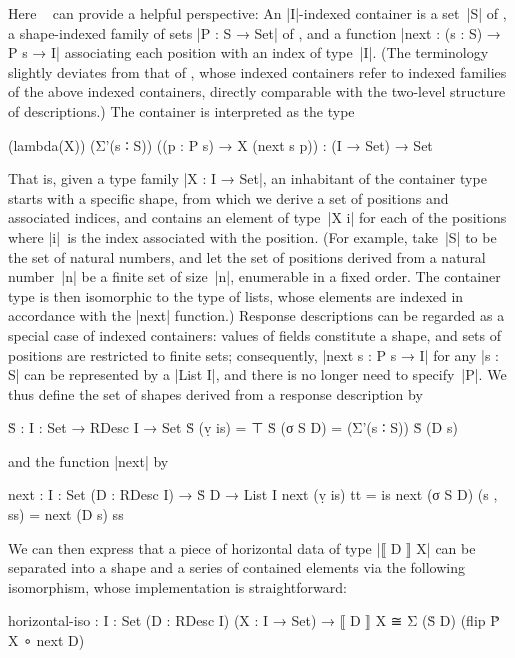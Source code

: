 Here ~\citep[Chapter~8]{Morris-thesis} can provide a helpful perspective:
An |I|-indexed container is a set~|S| of , a shape-indexed family of sets |P : S → Set| of , and a function |next : (s : S) → P s → I| associating each position with an index of type~|I|.
(The terminology slightly deviates from that of \citeauthor{Morris-thesis}, whose indexed containers refer to indexed families of the above indexed containers, directly comparable with the two-level structure of descriptions.)
The container is interpreted as the type
\begin{code}
(lambda(X)) (Σ'(s ∶ S)) ((p : P s) → X (next s p)) : (I → Set) → Set
\end{code}
That is, given a type family |X : I → Set|, an inhabitant of the container type starts with a specific shape, from which we derive a set of positions and associated indices, and contains an element of type~|X i| for each of the positions where |i|~is the index associated with the position.
(For example, take~|S| to be the set of natural numbers, and let the set of positions derived from a natural number~|n| be a finite set of size~|n|, enumerable in a fixed order.
The container type is then isomorphic to the type of lists, whose elements are indexed in accordance with the |next| function.)
Response descriptions can be regarded as a special case of indexed containers: values of fields constitute a shape, and sets of positions are restricted to finite sets; consequently, |next s : P s → I| for any |s : S| can be represented by a |List I|, and there is no longer need to specify~|P|.
We thus define the set of shapes derived from a response description by
\begin{code}
Ṡ : {I : Set} → RDesc I → Set
Ṡ (ṿ is)   = ⊤
Ṡ (σ S D)  = (Σ'(s ∶ S)) Ṡ (D s)
\end{code}
and the function |next| by
\begin{code}
next : {I : Set} (D : RDesc I) → Ṡ D → List I
next (ṿ is)   tt        = is
next (σ S D)  (s , ss)  = next (D s) ss
\end{code}
We can then express that a piece of horizontal data of type |⟦ D ⟧ X| can be separated into a shape and a series of contained elements via the following isomorphism, whose implementation is straightforward:
\begin{code}
horizontal-iso :  {I : Set} (D : RDesc I) (X : I → Set) →
                  ⟦ D ⟧ X ≅ Σ (Ṡ D) (flip Ṗ X ∘ next D)
\end{code}

